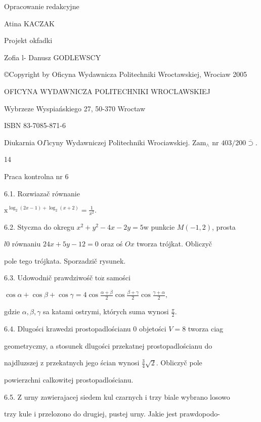 \documentclass[a4paper,12pt]{article}
\begin{document}
Opracowanie redakcyjne

Atina KACZAK

Projekt okfadki

Zofia l- Danusz GODLEWSCY

\copyright Copyright by Oficyna Wydawnicza Politechniki Wroctawskiej, Wrociaw 2005

OFICYNA WYDAWNICZA POLITECHNIKI WROCLAWSKIEJ

Wybrzeze Wyspiańskiego 27, 50-370 Wroctaw

ISBN 83-7085-871-6

Diukarnia $\mathrm{O}\Gamma$icyny Wydawniczej Politechniki Wrociawskiej. $\mathrm{Z}\mathrm{a}\mathrm{m}_{\wedge}$ nr $403/200\overline{\supset}.$





14

Praca kontrolna nr 6

6.1. Rozwiazač równanie

$\displaystyle \mathrm{x}^{\log_{2}(2x-1)+\log_{2}(x+2)}=\frac{1}{x^{2}}.$

6.2. Styczna do okregu $x^{2}+y^{2}-4x-2y=5\mathrm{w}$ punkcie $M(-1,2)$, prosta

$l0$ równaniu $24x+5y-12=0$ oraz oś $Ox$ tworza trójkat. Obliczyč

pole tego trójkata. Sporzadzič rysunek.

6.3. Udowodnič prawdziwośč $\mathrm{t}\mathrm{o}\dot{\mathrm{z}}$ samości

$\displaystyle \cos\alpha+\cos\beta+\cos\gamma=4\cos\frac{\alpha+\beta}{2}\cos\frac{\beta+\gamma}{2}\cos\frac{\gamma+\alpha}{2},$

gdzie $\alpha, \beta, \gamma$ sa katami ostrymi, których suma wynosi $\displaystyle \frac{\pi}{2}.$

6.4. Dlugości krawedzi prostopadlościanu $0$ objetości $V = 8$ tworza ciag

geometryczny, a stosunek dlugości przekatnej prostopadlościanu do

najdluzszej $\mathrm{z}$ przekatnych jego ścian wynosi $\displaystyle \frac{3}{4}\sqrt{2}$. Obliczyč pole

powierzchni calkowitej prostopadlościanu.

6.5. $\mathrm{Z}$ urny zawierajacej siedem kul czarnych $\mathrm{i}$ trzy biale wybrano losowo

trzy kule $\mathrm{i}$ przelozono do drugiej, pustej urny. Jakie jest prawdopodo-
\end{document}
